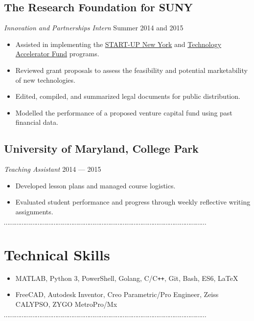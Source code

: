 \documentclass[10pt]{article}
\newcommand{\dotfringe}{
    \begin{center}
      $\cdots\cdots\cdots\cdots\cdots\cdots\cdots\cdots\cdots\cdots\cdots\cdots\cdots\cdots\cdots\cdots\cdots\cdots\cdots\cdots\cdots\cdots\cdots\cdots\cdots\cdots\cdots\cdots\cdots\cdots\cdots\cdots\cdots\cdots\cdots\cdots\cdots\cdots$
    \end{center}
}
\begin{document}
\subsection*{The Research Foundation for SUNY}
\textit{Innovation and Partnerships Intern} \hfill Summer 2014 and 2015
\begin{itemize}
  \item Assisted in implementing the \href{https://startup.ny.gov/}{START-UP New York} and \href{https://www.rfsuny.org/Our-Work/Innovation-and-Partnerships/Programs/Technology-Accelerator-Fund/}{Technology Accelerator Fund} programs.
  \item Reviewed grant proposals to assess the feasibility and potential marketability of new technologies.
  \item Edited, compiled, and summarized legal documents for public distribution.
  \item Modelled the performance of a proposed venture capital fund using past financial data.
\end{itemize}
\subsection*{University of Maryland, College Park}
\textit{Teaching Assistant} \hfill 2014 --- 2015
\begin{itemize}
  \item Developed lesson plans and managed course logistics.
  \item Evaluated student performance and progress through weekly reflective writing assignments.
\end{itemize}
\dotfringe{}
\section*{Technical Skills}
\begin{itemize}
  \item MATLAB, Python 3, PowerShell, Golang, C/C\texttt{++}, Git, Bash, ES6, \LaTeX{}
  \item FreeCAD, Autodesk Inventor, Creo Parametric/Pro Engineer, Zeiss CALYPSO, ZYGO MetroPro/Mx
\end{itemize}

\dotfringe{}
\end{document}
